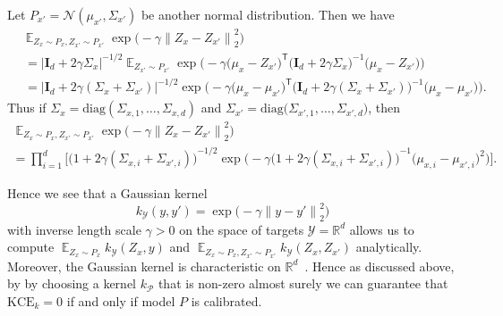 \documentclass{article}
\DeclareMathOperator{\Exp}{\mathbb{E}}
\begin{document}
Let $P_{x'} = \mathcal{N}(\mu_{x'}, \Sigma_{x'})$ be another
normal distribution. Then we have
\begin{equation*}
    \begin{split}
        &\Exp_{Z_x \sim P_x, Z_{x'} \sim P_{x'}} \exp{\Big(- \gamma {\|Z_x - Z_{x'}\|}^2_2\Big)} \\
        &\, = \big|\mathbf{I}_{d} + 2\gamma \Sigma_x\big|^{-1/2} \Exp_{Z_{x'} \sim P_{x'}} \exp{\Big(-\gamma {\big(\mu_x - Z_{x'}\big)}^\mathsf{T} {\big(\mathbf{I}_{d} + 2\gamma \Sigma_x\big)}^{-1} {\big(\mu_x - Z_{x'}\big)}\Big)} \\
        &\, = \big|\mathbf{I}_{d} + 2\gamma (\Sigma_x + \Sigma_{x'})\big|^{-1/2} \exp{\Big(-\gamma {\big(\mu_x - \mu_{x'}\big)}^\mathsf{T} {\big(\mathbf{I}_{d} + 2\gamma(\Sigma_x + \Sigma_{x'})\big)}^{-1} {\big(\mu_x - \mu_{x'}\big)}\Big)}.
    \end{split}
\end{equation*}
Thus if $\Sigma_x = \mathrm{diag}{(\Sigma_{x,1}, \ldots, \Sigma_{x,d})}$
and $\Sigma_{x'} = \mathrm{diag}{\big(\Sigma_{x',1}, \ldots, \Sigma_{x',d}\big)}$, then
\begin{multline*}
    \Exp_{Z_x \sim P_x, Z_{x'} \sim P_{x'}} \exp{\Big(- \gamma {\|Z_x - Z_{x'}\|}^2_2\Big)} \\
    = \prod_{i=1}^{d} \bigg[{\big(1 + 2\gamma (\Sigma_{x,i} + \Sigma_{x',i})\big)}^{-1/2} \exp{\Big(-\gamma{\big(1 + 2\gamma(\Sigma_{x,i} + \Sigma_{x',i})\big)}^{-1} {\big(\mu_{x,i} - \mu_{x',i}\big)}^2 \Big)} \bigg].
\end{multline*}

Hence we see that a Gaussian kernel
\begin{equation*}
    k_{\mathcal{Y}}(y, y') = \exp{\big(-\gamma {\|y - y'\|}_2^2\big)}
\end{equation*}
with inverse length scale $\gamma > 0$ on the space of
targets $\mathcal{Y} = \mathbb{R}^d$
allows us to compute $\Exp_{Z_x \sim P_x} k_{\mathcal{Y}}(Z_x, y)$ and
$\Exp_{Z_x \sim P_x, Z_{x'} \sim P_{x'}} k_{\mathcal{Y}}(Z_x, Z_{x'})$
analytically. Moreover, the Gaussian kernel is characteristic on
$\mathbb{R}^d$~\citep{Fukumizu2008}. Hence as discussed above, by
by choosing a kernel $k_{\mathcal{P}}$ that is non-zero almost surely we can
guarantee that $\mathrm{KCE}_k = 0$ if and only if model $P$ is
calibrated.
\end{document}
